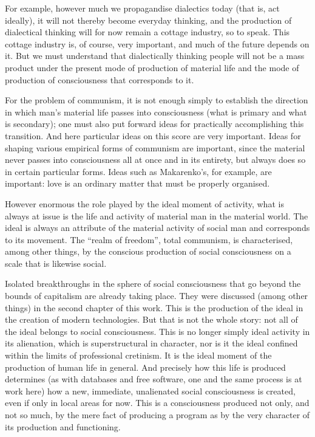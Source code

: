 \documentclass[12pt,a4paper,openany]{book}
\begin{document}
For example, however much we propagandise dialectics today (that is, act ideally), it will not thereby become everyday thinking, and the production of dialectical thinking will for now remain a cottage industry, so to speak. This cottage industry is, of course, very important, and much of the future depends on it. But we must understand that dialectically thinking people will not be a mass product under the present mode of production of material life and the mode of production of consciousness that corresponds to it.

For the problem of communism, it is not enough simply to establish the direction in which man’s material life passes into consciousness (what is primary and what is secondary); one must also put forward ideas for practically accomplishing this transition. And here particular ideas on this score are very important. Ideas for shaping various empirical forms of communism are important, since the material never passes into consciousness all at once and in its entirety, but always does so in certain particular forms. Ideas such as Makarenko’s, for example, are important: love is an ordinary matter that must be properly organised.

However enormous the role played by the ideal moment of activity, what is always at issue is the life and activity of material man in the material world. The ideal is always an attribute of the material activity of social man and corresponds to its movement. The “realm of freedom”, total communism, is characterised, among other things, by the conscious production of social consciousness on a scale that is likewise social.

Isolated breakthroughs in the sphere of social consciousness that go beyond the bounds of capitalism are already taking place. They were discussed (among other things) in the second chapter of this work. This is the production of the ideal in the creation of modern technologies. But that is not the whole story: not all of the ideal belongs to social consciousness. This is no longer simply ideal activity in its alienation, which is superstructural in character, nor is it the ideal confined within the limits of professional cretinism. It is the ideal moment of the production of human life in general. And precisely how this life is produced determines (as with databases and free software, one and the same process is at work here) how a new, immediate, unalienated social consciousness is created, even if only in local areas for now. This is a consciousness produced not only, and not so much, by the mere fact of producing a program as by the very character of its production and functioning.
\end{document}
